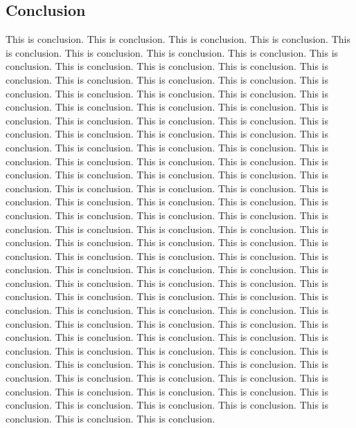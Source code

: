 \documentclass[hyperref]{ctexart}
\begin{document}
\begin{multicols}{2}
	\section{Conclusion}\label{sec:conclusion}
	This is conclusion.
	This is conclusion.
	This is conclusion.
	This is conclusion.
	This is conclusion.
	This is conclusion.
	This is conclusion.
	This is conclusion.
	This is conclusion.
	This is conclusion.
	This is conclusion.
	This is conclusion.
	This is conclusion.
	This is conclusion.
	This is conclusion.
	This is conclusion.
	This is conclusion.
	This is conclusion.
	This is conclusion.
	This is conclusion.
	This is conclusion.
	This is conclusion.
	This is conclusion.
	This is conclusion.
	This is conclusion.
	This is conclusion.
	This is conclusion.
	This is conclusion.
	This is conclusion.
	This is conclusion.
	This is conclusion.
	This is conclusion.
	This is conclusion.
	This is conclusion.
	This is conclusion.
	This is conclusion.
	This is conclusion.
	This is conclusion.
	This is conclusion.
	This is conclusion.
	This is conclusion.
	This is conclusion.
	This is conclusion.
	This is conclusion.
	This is conclusion.
	This is conclusion.
	This is conclusion.
	This is conclusion.
	This is conclusion.
	This is conclusion.
	This is conclusion.
	This is conclusion.
	This is conclusion.
	This is conclusion.
	This is conclusion.
	This is conclusion.
	This is conclusion.
	This is conclusion.
	This is conclusion.
	This is conclusion.
	This is conclusion.
	This is conclusion.
	This is conclusion.
	This is conclusion.
	This is conclusion.
	This is conclusion.
	This is conclusion.
	This is conclusion.
	This is conclusion.
	This is conclusion.
	This is conclusion.
	This is conclusion.
	This is conclusion.
	This is conclusion.
	This is conclusion.
	This is conclusion.
	This is conclusion.
	This is conclusion.
	This is conclusion.
	This is conclusion.
	This is conclusion.
	This is conclusion.
	This is conclusion.
	This is conclusion.
	This is conclusion.
	This is conclusion.
	This is conclusion.
	This is conclusion.
	This is conclusion.
	This is conclusion.
	This is conclusion.
	This is conclusion.
	This is conclusion.
	This is conclusion.
	This is conclusion.
	This is conclusion.
	This is conclusion.
	This is conclusion.
	This is conclusion.
	This is conclusion.
	This is conclusion.
	This is conclusion.
	This is conclusion.
	This is conclusion.
	This is conclusion.
	This is conclusion.
	This is conclusion.
	This is conclusion.
	This is conclusion.
	This is conclusion.
	This is conclusion.
	This is conclusion.
	This is conclusion.
	This is conclusion.
	This is conclusion.

\end{multicols}
\end{document}
